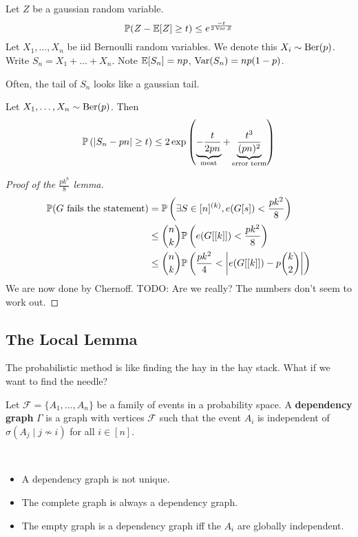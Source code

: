\documentclass{article}
\begin{document}
Let $Z$ be a gaussian random variable.
$$\mathbb P(Z - \mathbb E[Z] \ge t) \le e^{\frac{-t}{2\operatorname{Var} Z}}$$
Let $X_1, \dots, X_n$ be iid Bernoulli random variables. We denote this $X_i \sim \operatorname{Ber}(p)$. Write $S_n = X_1 + \dots + X_n$. Note $\mathbb E[S_n] = np$, $\operatorname{Var}(S_n)=np(1 - p)$.

\begin{idea}
  Often, the tail of $S_n$ looks like a gaussian tail.
\end{idea}

\begin{thm}
  Let $X_1, \dots, X_n \sim \operatorname{Ber}(p)$. Then
  $$\mathbb P\left(\left\lvert S_n - pn\right\rvert \ge t\right) \le 2\exp\left(\underbrace{-\frac t{2pn}}_{\text{meat}} + \underbrace{\frac{t^3}{(pn)^2}}_{\text{error term}}\right)$$
\end{thm}

\newlec

\begin{proof}[Proof of the $\frac{pk^8}8$ lemma]
  \begin{align*}
    \mathbb P(G \text{ fails the statement})
    & = \mathbb P\left(\exists S \in [n]^{(k)}, e(G[s]) < \frac{pk^2}8\right) \\
    & \le \binom nk \mathbb P\left(e(G[[k]]) < \frac{pk^2}8\right) \\
    & \le \binom nk \mathbb P\left(\frac{pk^2}4 < \left\lvert e(G[[k]]) - p\binom k2\right\rvert\right)
  \end{align*}
  We are now done by Chernoff. TODO: Are we really? The numbers don't seem to work out.
\end{proof}

\subsection{The Local Lemma}

The probabilistic method is like finding the hay in the hay stack. What if we want to find the needle?

\begin{defi}
  Let $\mathcal F = \{A_1, \dots, A_n\}$ be a family of events in a probability space. A {\bf dependency graph} $\Gamma$ is a graph with vertices $\mathcal F$ such that the event $A_i$ is independent of $\sigma(A_j \mid j \not\sim i)$ for all $i \in [n]$.
\end{defi}

\begin{rmks}~
  \begin{itemize}
    \item A dependency graph is not unique.
    \item The complete graph is always a dependency graph.
    \item The empty graph is a dependency graph iff the $A_i$ are globally independent.
  \end{itemize}
\end{rmks}
\end{document}
